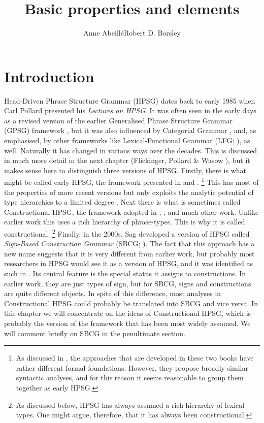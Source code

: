 \documentclass[output=paper,biblatex,babelshorthands,newtxmath,draftmode,colorlinks,citecolor=brown]{langscibook}
\title{Basic properties and elements}
\author{Anne Abeillé\affiliation{Université de Paris}\lastand Robert D. Borsley\affiliation{University of Essex and Bangor University}}
\begin{document}
\maketitle
\label{chapter-basic-properties}\label{chap-properties}

\section{Introduction}\label{sec:prop1}
\label{prop:sec-intro}

Head-Driven Phrase Structure Grammar (HPSG) dates back to early 1985 when Carl Pollard presented his
\emph{Lectures on HPSG}. It was often seen in the early days as a revised version of the earlier
Generalised Phrase Structure Grammar (GPSG) framework \citep*{GKPS85a}, but it was also influenced
by Categorial Grammar \citep{Ajdukiewicz35a-u,Steedman2000a-u}, and, as \citet[1]{ps} emphasised, by
other frameworks like Lexical-Functional Grammar (LFG; \citealt{Bresnan82a-ed}), as well. Naturally
it has changed in various ways over the decades. This is discussed in much more detail in the next
chapter (Flickinger, Pollard \& Wasow \citeyear{chapters/evolution}),
but it makes sense here to distinguish three versions of
HPSG. Firstly, there is what might be called early HPSG, the framework presented in \citet{ps} and
\citet{ps2}.%
%
\footnote{As discussed in , the approaches that are developed in
  these two books have rather different formal foundations. However, they propose broadly similar
  syntactic analyses, and for this reason it seems reasonable to group them together as early HPSG.} 
%
This has most of the properties of more recent versions but only exploits the analytic potential of
type hierarchies to a limited degree \citep*{Flickinger87,FPW85a}. Next there is what is sometimes
called Constructional HPSG, the framework adopted in , , and much
other work. Unlike earlier work this uses a rich hierarchy of phrase-types. This is why it is called
constructional.%
%
\footnote{As discussed below, HPSG has always assumed a rich hierarchy of lexical types. One might
  argue, therefore, that it has always been constructional.} 
%
Finally, in the 2000s, Sag developed a version of HPSG called \emph{Sign-Based Construction Grammar}\indexsbcg
(SBCG; \citealt{Sag2012a}). The fact that this approach has a new name suggests that it is very
different from earlier work, but probably most researchers in HPSG would see it as a version of
HPSG, and it was identified as such in \citet[486]{Sag2010b}. Its central feature is the special
status it assigns to constructions. In earlier work, they are just types of sign, but for SBCG,
signs and constructions are quite different objects. In spite of this difference, most analyses in
Constructional HPSG could probably be translated into SBCG and vice versa. In this chapter we will
concentrate on the ideas of Constructional HPSG, which is probably the version of the framework that
has been most widely assumed. We will comment briefly on SBCG in the penultimate section. 
\end{document}

